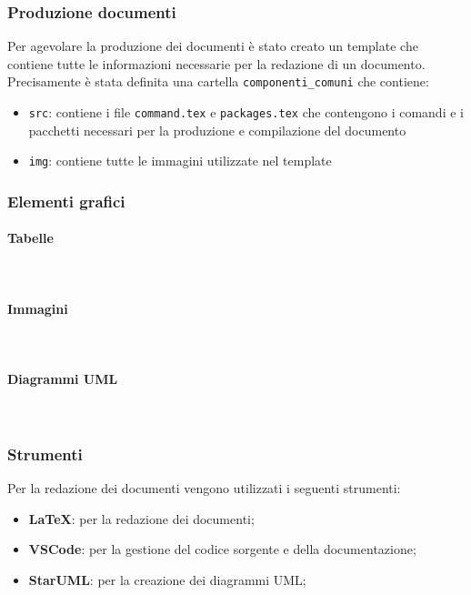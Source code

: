     \subsubsection{Produzione documenti}
    Per agevolare la produzione dei documenti è stato creato un template che contiene tutte le informazioni necessarie per la redazione di un documento.\\
    Precisamente è stata definita una cartella \texttt{componenti\_comuni} che contiene:
    \begin{itemize}
        \item \texttt{src}: contiene i file \texttt{command.tex} e \texttt{packages.tex} che contengono i comandi e i pacchetti necessari per la produzione e compilazione del documento
        \item \texttt{img}: contiene tutte le immagini utilizzate nel template
    \end{itemize}

    \subsubsection{Elementi grafici}
        \paragraph{Tabelle} ~

        \paragraph{Immagini} ~

        \paragraph{Diagrammi UML} ~

    \subsubsection{Strumenti}
        Per la redazione dei documenti vengono utilizzati i seguenti strumenti:
        \begin{itemize}
            \item \textbf{LaTeX}: per la redazione dei documenti;
            \item \textbf{VSCode}: per la gestione del codice sorgente e della documentazione;
            \item \textbf{StarUML}: per la creazione dei diagrammi UML;
        \end{itemize}

